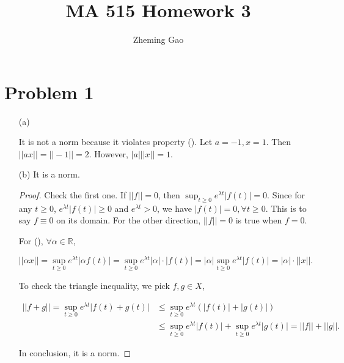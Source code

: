 \documentclass[12pt]{article}
\begin{document}
 
 
\title{MA 515 Homework 3}
\author{Zheming Gao}
\maketitle

\section*{Problem 1}

\begin{enumerate}
\item [(a)]

It is not a norm because it violates property (). Let $a = -1, x = 1$. Then $||ax|| = ||-1|| = 2$. However, $|a|||x|| = 1$.

\item [(b)]
It is a norm.

\begin{proof}

Check the first one. If $||f|| = 0$, then $\sup_{t\geqslant 0} e^{\lambda t}|f(t)| = 0$. Since for any $t\geqslant 0$, $e^{\lambda t}|f(t)| \geqslant 0$ and $e^{\lambda t} > 0$, we have  $|f(t)| = 0, \forall t\geqslant 0$. This is to say $f \equiv 0$ on its domain. For the other direction, $||f|| = 0$ is true when $f = 0$.

For (), $\forall \alpha \in \mathbb{R}$,

$$
||\alpha x|| = \sup_{t\geqslant 0} e^{\lambda t}|\alpha f(t)| = \sup_{t\geqslant 0} e^{\lambda t}|\alpha|\cdot|f(t)| = |\alpha| \sup_{t\geqslant 0} e^{\lambda t}|f(t)| = |\alpha|\cdot ||x||.
$$

To check the triangle inequality, we pick $f, g \in X$,

$$
\begin{aligned}
||f + g|| = \sup_{t\geqslant 0} e^{\lambda t}|f(t) + g(t)| & \leqslant \sup_{t\geqslant 0} e^{\lambda t}\left(|f(t)| + |g(t)|\right)\\
& \leqslant \sup_{t\geqslant 0} e^{\lambda t}|f(t)| + \sup_{t\geqslant 0} e^{\lambda t}|g(t)| = ||f|| + ||g||.
\end{aligned}
$$

In conclusion, it is a norm.


\end{proof}
\end{enumerate}
\end{document}
